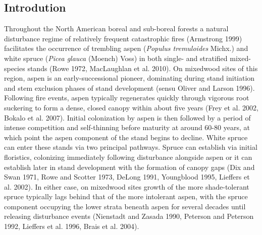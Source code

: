 \documentclass{article}\usepackage[]{graphicx}\usepackage[]{color}
\begin{document}
\begin{multicols}{2}
\section{Introdution}
Throughout the North American boreal and sub-boreal forests a natural disturbance regime of relatively frequent catastrophic fires (Armstrong 1999) facilitates the occurrence of trembling aspen (\textit{Populus tremuloides} Michx.) and white spruce (\textit{Picea glauca} (Moench) Voss) in both single- and stratified mixed-species stands (Rowe 1972, MacLaughlan et al. 2010). On mixedwood sites of this region, aspen is an early-successional pioneer, dominating during stand initiation and stem exclusion phases of stand development (sensu Oliver and Larson 1996). Following fire events, aspen typically regenerates quickly through vigorous root suckering to form a dense, closed canopy within about five years (Frey et al. 2002, Bokalo et al. 2007). Initial colonization by aspen is then followed by a period of intense competition and self-thinning before maturity at around 60-80 years, at which point the aspen component of the stand begins to decline. White spruce can enter these stands via two principal pathways. Spruce can establish via initial floristics, colonizing immediately following disturbance alongside aspen or it can establish later in stand development with the formation of canopy gaps (Dix and Swan 1971, Rowe and Scotter 1973, DeLong 1991, Youngblood 1995, Lieffers et al. 2002). In either case, on mixedwood sites growth of the more shade-tolerant spruce typically lags behind that of the more intolerant aspen, with the spruce component occupying the lower strata beneath aspen for several decades until releasing disturbance events (Nienstadt and Zasada 1990, Peterson and Peterson 1992, Lieffers et al. 1996, Brais et al. 2004).


\end{multicols}
\end{document}
